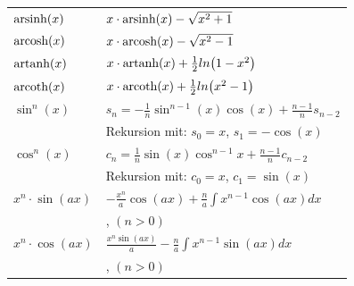 \documentclass[a4paper]{article}
\begin{document}
\begin{appendix}
\begin{fmerke}
\begin{multicols}{2}
\begin{tabular}{l|l}
					$\text{arsinh}(x)$            &  $x\cdot \text{arsinh}(x)-\sqrt{x^2+1}$ \\
					$\text{arcosh}(x)$            &  $x\cdot \text{arcosh}(x)-\sqrt{x^2-1}$ \\
					$\text{artanh}(x)$            &  $x\cdot \text{artanh}(x)+\frac{1}{2} ln{\left(1-x^2\right)}$ \\
					$\text{arcoth}(x)$            &  $x\cdot \text{arcoth}(x)+\frac{1}{2} ln{\left(x^2-1\right)}$ \\

					$\sin^n(x)$            &  $s_n = -\frac{1}{n}\sin^{n-1}(x)\cos(x)+\frac{n-1}{n}s_{n-2}$ \\
					& \small Rekursion mit: $s_0 = x$, $s_1 = -\cos(x)$ \\
					$\cos^n(x)$            &  $c_n = \frac{1}{n}\sin(x)\cos^{n-1}{x}+\frac{n-1}{n}c_{n-2}$ \\
					& \small Rekursion mit: $c_0 = x$, $c_1 = \sin(x)$ \\

					$x^n \cdot \sin(ax)$            &  $-\frac{x^n}{a}\cos(ax)+\frac{n}{a}\int x^{n-1}\cos(ax) dx$ \\
													&  , $(n > 0)$ \\
					$x^n \cdot \cos(ax)$            &  $\frac{x^n \sin(ax)}{a}-\frac{n}{a} \int x^{n-1} \sin(ax) dx$ \\
													&  , $(n > 0)$
				\end{tabular}
			\end{multicols}
		\end{fmerke}
	

\end{appendix}
\end{document}
